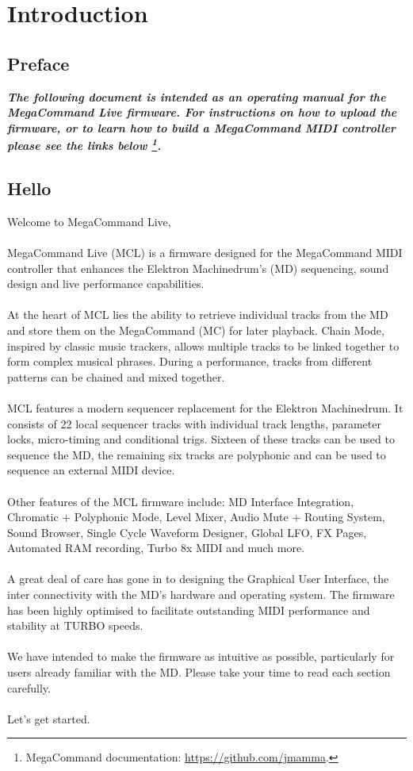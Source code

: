 \chapter{Introduction}

\section{Preface}

\begin{small}
\textbf{\textit{The following document is intended as an operating manual for the MegaCommand Live firmware. For instructions on how to upload the firmware, or to learn how to build a MegaCommand MIDI controller please see the links below \footnote{MegaCommand documentation: \url{https://github.com/jmamma}.}.}}
\end{small}

\section{Hello}
Welcome to MegaCommand Live, 
\\
\\
MegaCommand Live (MCL) is a firmware designed for the MegaCommand MIDI controller that enhances the Elektron Machinedrum's (MD) sequencing, sound design and live performance capabilities.
\\
\\
At the heart of MCL lies the ability to retrieve individual tracks from the MD and store them on the MegaCommand (MC) for later playback. Chain Mode, inspired by classic music trackers, allows multiple tracks to be linked together to form complex musical phrases. During a performance, tracks from different patterns can be chained and mixed together.
\\
\\
MCL features a modern sequencer replacement for the Elektron Machinedrum. It consists of 22 local sequencer tracks with individual track lengths, parameter locks, micro-timing and conditional trigs. Sixteen of these tracks can be used to sequence the MD, the remaining six tracks are polyphonic and can be used to sequence an external MIDI device.
\\
\\
Other features of the MCL firmware include: MD Interface Integration, Chromatic + Polyphonic Mode,  Level Mixer, Audio Mute + Routing System, Sound Browser, Single Cycle Waveform Designer, Global LFO, FX Pages, Automated RAM recording, Turbo 8x MIDI and much more.
\\
\\
A great deal of care has gone in to designing the Graphical User Interface, the inter connectivity with the MD's hardware and operating system. The firmware has been highly optimised to facilitate outstanding MIDI performance and stability at TURBO speeds.
\\
\\
We have intended to make the firmware as intuitive as possible, particularly for users already familiar with the MD. Please take your time to read each section carefully. 
\\
\\
Let's get started.